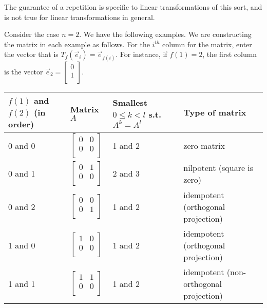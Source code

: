 \documentclass[10pt]{amsart}
\begin{document}
The guarantee of a repetition is specific to linear transformations of
this sort, and is not true for linear transformations in general.

Consider the case $n = 2$. We have the following examples. We are
constructing the matrix in each example as follows. For the $i^{th}$
column for the matrix, enter the vector that is $T_f(\vec{e}_i) =
\vec{e}_{f(i)}$. For instance, if $f(1) = 2$, the first column is the
vector $\vec{e}_2 = \left[\begin{matrix} 0 \\ 1 \\\end{matrix}\right]$.

\vspace{0.2in}

\begin{tabular}{|l|l|l|l|}
  \hline
  $f(1)$ and $f(2)$ (in order) & Matrix $A$ & Smallest $0 \le k < l$ s.t. $A^k = A^l$& Type of matrix\\\hline
  0 and 0 & $\left[\begin{matrix} 0 & 0 \\ 0 & 0 \\\end{matrix}\right]$ & 1 and 2 & zero matrix\\\hline
  0 and 1 & $\left[\begin{matrix} 0 & 1 \\ 0 & 0 \\\end{matrix}\right]$ & 2 and 3 & nilpotent (square is zero)\\\hline
  0 and 2 & $\left[\begin{matrix} 0 & 0 \\ 0 & 1 \\\end{matrix}\right]$ & 1 and 2 & idempotent (orthogonal projection)\\\hline
  1 and 0 & $\left[\begin{matrix} 1 & 0 \\ 0 & 0 \\\end{matrix}\right]$ & 1 and 2 & idempotent (orthogonal projection)\\\hline
  1 and 1 & $\left[ \begin{matrix} 1 & 1 \\ 0 & 0 \\\end{matrix}\right]$ & 1 and 2 & idempotent (non-orthogonal projection)\\\hline

\end{tabular}
\end{document}
